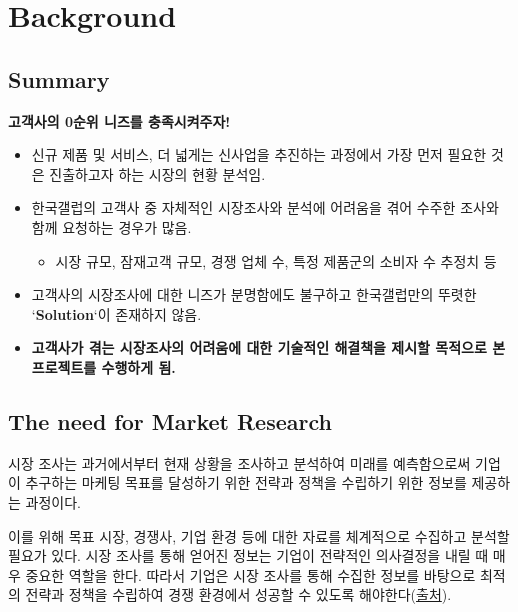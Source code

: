 \documentclass[
]{book}
\providecommand{\tightlist}{%
  \setlength{\itemsep}{0pt}\setlength{\parskip}{0pt}}
\begin{document}
\hypertarget{background}{%
\chapter{Background}\label{background}}

\hypertarget{summary}{%
\section{Summary}\label{summary}}

\textbf{고객사의 0순위 니즈를 충족시켜주자!}

\begin{itemize}
\item
  신규 제품 및 서비스, 더 넓게는 신사업을 추진하는 과정에서 가장 먼저 필요한 것은 진출하고자 하는 시장의 현황 분석임.
\item
  한국갤럽의 고객사 중 자체적인 시장조사와 분석에 어려움을 겪어 수주한 조사와 함께 요청하는 경우가 많음.

  \begin{itemize}
  \tightlist
  \item
    시장 규모, 잠재고객 규모, 경쟁 업체 수, 특정 제품군의 소비자 수 추정치 등
  \end{itemize}
\item
  고객사의 시장조사에 대한 니즈가 분명함에도 불구하고 한국갤럽만의 뚜렷한 `\textbf{Solution}`이 존재하지 않음.
\item
  \textbf{고객사가 겪는 시장조사의 어려움에 대한 기술적인 해결책을 제시할 목적으로 본 프로젝트를 수행하게 됨.}
\end{itemize}

\hypertarget{the-need-for-market-research}{%
\section{The need for Market Research}\label{the-need-for-market-research}}

시장 조사는 과거에서부터 현재 상황을 조사하고 분석하여 미래를 예측함으로써 기업이 추구하는 마케팅 목표를 달성하기 위한 전략과 정책을 수립하기 위한 정보를 제공하는 과정이다.

이를 위해 목표 시장, 경쟁사, 기업 환경 등에 대한 자료를 체계적으로 수집하고 분석할 필요가 있다. 시장 조사를 통해 얻어진 정보는 기업이 전략적인 의사결정을 내릴 때 매우 중요한 역할을 한다. 따라서 기업은 시장 조사를 통해 수집한 정보를 바탕으로 최적의 전략과 정책을 수립하여 경쟁 환경에서 성공할 수 있도록 해야한다(\href{http://bteam02.pbworks.com/w/page/4351587/\%EC\%8B\%9C\%EC\%9E\%A5\%20\%EC\%A1\%B0\%EC\%82\%AC}{출처}).
\end{document}

